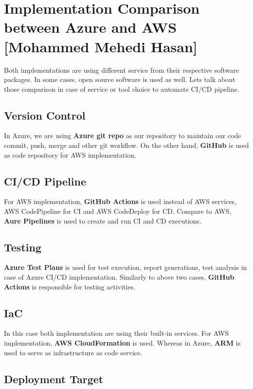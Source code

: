 \section{Implementation Comparison between Azure and AWS [Mohammed Mehedi Hasan]}

Both implementations are using different service from their respective software packages. In some cases, open source software is used as well. Lets talk about those comparison in case of service or tool choice to automate CI/CD pipeline.

\subsection{Version Control}

In Azure, we are using \textbf{Azure git repo} as our repository to maintain our code commit, push, merge and other git workflow. On the other hand, \textbf{GitHub} is used as code repository for AWS implementation.

\subsection{CI/CD Pipeline}

For AWS implementation, \textbf{GitHub Actions} is used instead of AWS services, AWS CodePipeline for CI and AWS CodeDeploy for CD. Compare to AWS, \textbf{Aure Pipelines} is used to create and run CI and CD executions.

\subsection{Testing}

\textbf{Azure Test Plans} is used for test execution, report generations, test analysis in case of Azure CI/CD implementation. Similarly to above two cases, \textbf{GitHub Actions} is responsible for testing activities.

\subsection{IaC}

In this case both implementation are using their built-in services. For AWS implementation, \textbf{AWS CloudFormation} is used. Whereas in Azure, \textbf{ARM} is used to serve as infrastructure as code service.

\subsection{Deployment Target}

